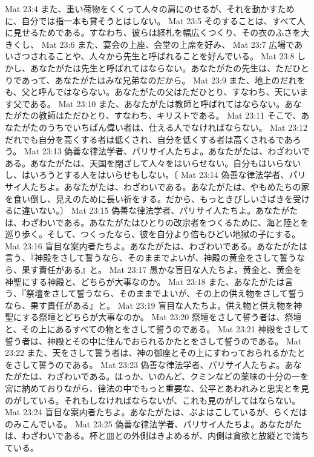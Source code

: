 Mat 23:4  また、重い荷物をくくって人々の肩にのせるが、それを動かすために、自分では指一本も貸そうとはしない。
Mat 23:5  そのすることは、すべて人に見せるためである。すなわち、彼らは経札を幅広くつくり、その衣のふさを大きくし、
Mat 23:6  また、宴会の上座、会堂の上席を好み、
Mat 23:7  広場であいさつされることや、人々から先生と呼ばれることを好んでいる。
Mat 23:8  しかし、あなたがたは先生と呼ばれてはならない。あなたがたの先生は、ただひとりであって、あなたがたはみな兄弟なのだから。
Mat 23:9  また、地上のだれをも、父と呼んではならない。あなたがたの父はただひとり、すなわち、天にいます父である。
Mat 23:10  また、あなたがたは教師と呼ばれてはならない。あなたがたの教師はただひとり、すなわち、キリストである。
Mat 23:11  そこで、あなたがたのうちでいちばん偉い者は、仕える人でなければならない。
Mat 23:12  だれでも自分を高くする者は低くされ、自分を低くする者は高くされるであろう。
Mat 23:13  偽善な律法学者、パリサイ人たちよ。あなたがたは、わざわいである。あなたがたは、天国を閉ざして人々をはいらせない。自分もはいらないし、はいろうとする人をはいらせもしない。〔
Mat 23:14  偽善な律法学者、パリサイ人たちよ。あなたがたは、わざわいである。あなたがたは、やもめたちの家を食い倒し、見えのために長い祈をする。だから、もっときびしいさばきを受けるに違いない。〕
Mat 23:15  偽善な律法学者、パリサイ人たちよ。あなたがたは、わざわいである。あなたがたはひとりの改宗者をつくるために、海と陸とを巡り歩く。そして、つくったなら、彼を自分より倍もひどい地獄の子にする。
Mat 23:16  盲目な案内者たちよ。あなたがたは、わざわいである。あなたがたは言う、『神殿をさして誓うなら、そのままでよいが、神殿の黄金をさして誓うなら、果す責任がある』と。
Mat 23:17  愚かな盲目な人たちよ。黄金と、黄金を神聖にする神殿と、どちらが大事なのか。
Mat 23:18  また、あなたがたは言う、『祭壇をさして誓うなら、そのままでよいが、その上の供え物をさして誓うなら、果す責任がある』と。
Mat 23:19  盲目な人たちよ。供え物と供え物を神聖にする祭壇とどちらが大事なのか。
Mat 23:20  祭壇をさして誓う者は、祭壇と、その上にあるすべての物とをさして誓うのである。
Mat 23:21  神殿をさして誓う者は、神殿とその中に住んでおられるかたとをさして誓うのである。
Mat 23:22  また、天をさして誓う者は、神の御座とその上にすわっておられるかたとをさして誓うのである。
Mat 23:23  偽善な律法学者、パリサイ人たちよ。あなたがたは、わざわいである。はっか、いのんど、クミンなどの薬味の十分の一を宮に納めておりながら、律法の中でもっと重要な、公平とあわれみと忠実とを見のがしている。それもしなければならないが、これも見のがしてはならない。
Mat 23:24  盲目な案内者たちよ。あなたがたは、ぶよはこしているが、らくだはのみこんでいる。
Mat 23:25  偽善な律法学者、パリサイ人たちよ。あなたがたは、わざわいである。杯と皿との外側はきよめるが、内側は貪欲と放縦とで満ちている。
